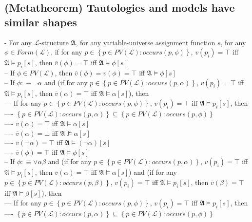 \documentclass{book}
\newcommand{\is}{:\equiv}
\newcommand{\inot}{\not}
\newcommand{\occurs}[2]{occurs(#1, #2)}
\newcommand{\extend}[1]{\overline{#1}}
\newcommand{\set}[1]{\left\{ #1 \right\}}
\begin{document}
\subsection{(Metatheorem) Tautologies and models have similar shapes} %
	- For any $\mathcal{L}$-structure $\mathfrak{A}$, for any variable-universe assignment function $s$, for any $\phi \in Form(\mathcal{L})$, if for any $p \in \set{p \in PV(\mathcal{L}): \occurs{p}{\phi}}$, $v(p_i) = \top$ iff $\mathfrak{A} \vDash p_i[s]$, then $\extend{v}(\phi) = \top$ iff $\mathfrak{A} \vDash \phi[s]$ \\
		-- If $\phi \in PV(\mathcal{L})$, then $\extend{v}(\phi) = v(\phi) = \top$ iff $\mathfrak{A} \vDash \phi[s]$ \\
		-- If $\phi \is \lnot \alpha$ and (if for any $p \in \set{p \in PV(\mathcal{L}): \occurs{p}{\alpha}}$, $v(p_i) = \top$ iff $\mathfrak{A} \vDash p_i[s]$, then $\extend{v}(\alpha) = \top$ iff $\mathfrak{A} \vDash \alpha[s]$), then \\
			--- If for any $p \in \set{p \in PV(\mathcal{L}): \occurs{p}{\phi}}$, $v(p_i) = \top$ iff $\mathfrak{A} \vDash p_i[s]$, then \\
				---- $\set{p \in PV(\mathcal{L}): \occurs{p}{\alpha}} \subseteq \set{p \in PV(\mathcal{L}): \occurs{p}{\phi}}$ \\
				---- $\extend{v}(\alpha) = \top$ iff $\mathfrak{A} \vDash \alpha[s]$ \\
				---- $\extend{v}(\alpha) = \bot$ iff $\mathfrak{A} \inot \vDash \alpha[s]$ \\
				---- $\extend{v}(\lnot \alpha) = \top$ iff $\mathfrak{A} \vDash (\lnot \alpha)[s]$ \\
				---- $\extend{v}(\phi) = \top$ iff $\mathfrak{A} \vDash \phi[s]$ \\
		-- If $\phi \is \lor \alpha \beta$ and (if for any $p \in \set{p \in PV(\mathcal{L}): \occurs{p}{\alpha}}$, $v(p_i) = \top$ iff $\mathfrak{A} \vDash p_i[s]$, then $\extend{v}(\alpha) = \top$ iff $\mathfrak{A} \vDash \alpha[s]$) and (if for any $p \in \set{p \in PV(\mathcal{L}): \occurs{p}{\beta}}$, $v(p_i) = \top$ iff $\mathfrak{A} \vDash p_i[s]$, then $\extend{v}(\beta) = \top$ iff $\mathfrak{A} \vDash \beta[s]$), then \\
			--- If for any $p \in \set{p \in PV(\mathcal{L}): \occurs{p}{\phi}}$, $v(p_i) = \top$ iff $\mathfrak{A} \vDash p_i[s]$, then \\
				---- $\set{p \in PV(\mathcal{L}): \occurs{p}{\alpha}} \subseteq \set{p \in PV(\mathcal{L}): \occurs{p}{\phi}}$ \\
\end{document}
